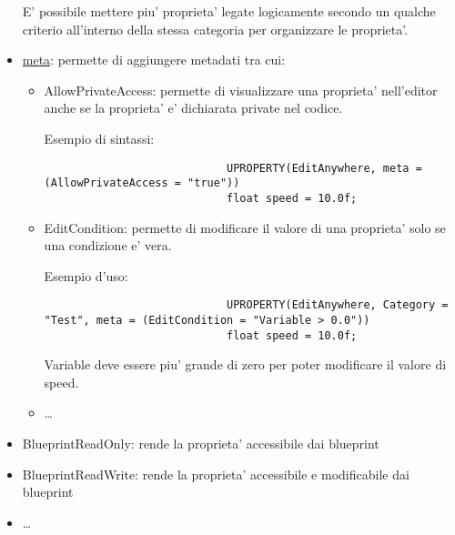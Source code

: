 \begin{itemize}
                \begin{notebox}
                    E' possibile mettere piu' proprieta' legate logicamente secondo un qualche criterio all'interno della stessa categoria per organizzare le proprieta'.
                \end{notebox}

            \item \href{https://docs.unrealengine.com/5.0/en-US/metadata-specifiers-in-unreal-engine/}{meta}: permette di aggiungere metadati tra cui:

                \begin{itemize}
                    \item AllowPrivateAccess: permette di visualizzare una proprieta' nell'editor anche se la proprieta' e' dichiarata private nel codice.

                        Esempio di sintassi:
                        \begin{verbatim}
                            UPROPERTY(EditAnywhere, meta = (AllowPrivateAccess = "true"))
                            float speed = 10.0f;
                        \end{verbatim}

                    \item EditCondition: permette di modificare il valore di una proprieta' solo se una condizione e' vera.

                        Esempio d'uso:
                        \begin{verbatim}
                            UPROPERTY(EditAnywhere, Category = "Test", meta = (EditCondition = "Variable > 0.0"))
                            float speed = 10.0f;
                        \end{verbatim}

                        Variable deve essere piu' grande di zero per poter modificare il valore di speed.

                    \item \dots
                \end{itemize}

            \item BlueprintReadOnly: rende la proprieta' accessibile dai blueprint
            \item BlueprintReadWrite: rende la proprieta' accessibile e modificabile dai blueprint
            \item \dots
        \end{itemize}

